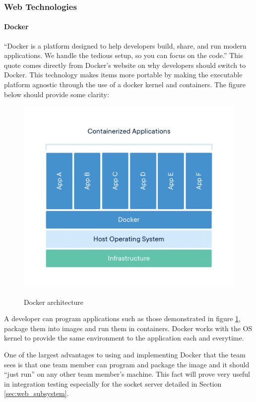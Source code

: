 \subsubsection{Web Technologies}\label{sec:web-tech}
\paragraph{Docker}
``Docker is a platform designed to help developers build, share, and run modern applications. We handle the tedious setup, so you can focus on the code.'' This quote comes directly from Docker's website on why developers should switch to Docker. This technology makes items more portable by making the executable platform agnostic through the use of a docker kernel and containers. The figure below should provide some clarity:

\begin{figure}[H]
    \caption{Docker architecture}
    \centering
    \includegraphics[width=\textwidth]{images/Docker-Architecture.png}
    \label{fig:docker_arch}
\end{figure}

A developer can program applications such as those demonstrated in figure \ref{fig:docker_arch}, package them into images and run them in containers. Docker works with the OS kernel to provide the same environment to the application each and everytime.

One of the largest advantages to using and implementing Docker that the team sees is that one team member can program and package the image and it should ``just run'' on any other team member's machine. This fact will prove very useful in integration testing especially for the socket server detailed in Section \ref{sec:web_subsystem}.

